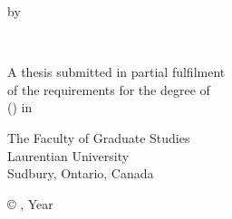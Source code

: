 \begin{titlepage}

    \begin{center}
        \vspace*{1.0cm}

        \thetitle

        \vspace{1.0cm}

        by \\

        \vspace*{1.0cm}

        {\givenname} \underline{\surname} \\

        \vspace*{3.0cm}

        A thesis submitted in partial fulfilment \\
        of the requirements for the degree of \\
        {\programdegree} (\degreeAbbr) in \program

        \vspace*{2.0cm}

        The Faculty of Graduate Studies \\
        Laurentian University \\
        Sudbury, Ontario, Canada \\

        \vspace*{3.0cm}

        {\copyright} {\theauthor}, Year \\

    \end{center}

\end{titlepage}